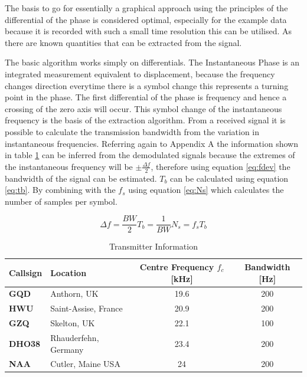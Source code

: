 The basis to go for essentially a graphical approach using the principles of the differential of the phase is considered optimal, especially for the example data because it is recorded with such a small time resolution this can be utilised. As there are known quantities that can be extracted from the signal. 



The basic algorithm works simply on differentials. The Instantaneous Phase is an integrated measurement equivalent to displacement, because the frequency changes direction everytime there is a symbol change this represents a turning point in the phase. The first differential of the phase is frequency and hence a crossing of the zero axis will occur. This symbol change of the instantaneous frequency is the basis of the extraction algorithm. From a received signal it is possible to calculate the transmission bandwidth from the variation in instantaneous frequencies. Referring again to Appendix A the information shown in table \ref{tab:transinfo} can be inferred from the demodulated signals because the extremes of the instantaneous frequency will be $\pm \frac{\Delta f}{2}$, therefore using equation \ref{eq:fdev} the bandwidth of the signal can be estimated. $T_b$ can be calculated using equation \ref{eq:tb}. By combining with the $f_s$ using equation \ref{eq:Ns} which calculates the number of samples per symbol. 

\begin{multicols}{3}
\begin{subequations}
\begin{equation}
    \Delta f = \frac{BW}{2}
    \label{eq:fdev}
\end{equation}
\begin{equation}
    T_b = \frac{1}{BW}
    \label{eq:tb}
\end{equation}
\begin{equation}
    N_s = f_sT_b
    \label{eq:Ns}
\end{equation}
\end{subequations}
\end{multicols}
\begin{table}[h!]
    \centering
    \begin{tabular}{l|l|c|c}
    \textbf{Callsign} & \textbf{Location} & \textbf{Centre Frequency
    $f_c$}[kHz] & \textbf{Bandwidth} [Hz] \\
    \hline
    \textbf{GQD} & Anthorn, UK & 19.6 & 200 \\
    \textbf{HWU} & Saint-Assise, France & 20.9 & 200 \\
    \textbf{GZQ} & Skelton, UK & 22.1 & 100 \\
    \textbf{DHO38} & Rhauderfehn, Germany & 23.4 & 200 \\
    \textbf{NAA} & Cutler, Maine USA & 24 & 200 \\
    \end{tabular}
    \caption{Transmitter Information}
    \label{tab:transinfo}
\end{table}

